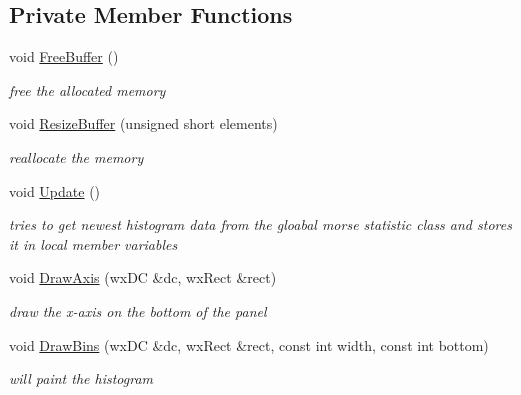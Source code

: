 \subsection*{Private Member Functions}
\begin{DoxyCompactItemize}
\item 
\mbox{\label{classHistogramPanel_aa72fe9e982dd595e60d7ffde9799a458}} 
void \hyperlink{classHistogramPanel_aa72fe9e982dd595e60d7ffde9799a458}{Free\+Buffer} ()
\begin{DoxyCompactList}\small\item\em free the allocated memory \end{DoxyCompactList}\item 
void \hyperlink{classHistogramPanel_ac9dfa965b82be4b009d95eddb9b15417}{Resize\+Buffer} (unsigned short elements)
\begin{DoxyCompactList}\small\item\em reallocate the memory \end{DoxyCompactList}\item 
\mbox{\label{classHistogramPanel_ae88368b1856f4a81b33017842c5eed01}} 
void \hyperlink{classHistogramPanel_ae88368b1856f4a81b33017842c5eed01}{Update} ()
\begin{DoxyCompactList}\small\item\em tries to get newest histogram data from the gloabal morse statistic class and stores it in local member variables \end{DoxyCompactList}\item 
void \hyperlink{classHistogramPanel_a4ae2b45e5450426cdcd47d1be81da36f}{Draw\+Axis} (wx\+DC \&dc, wx\+Rect \&rect)
\begin{DoxyCompactList}\small\item\em draw the x-\/axis on the bottom of the panel \end{DoxyCompactList}\item 
void \hyperlink{classHistogramPanel_ae17ba2aae2b01ddaeb158dd168829e7d}{Draw\+Bins} (wx\+DC \&dc, wx\+Rect \&rect, const int width, const int bottom)
\begin{DoxyCompactList}\small\item\em will paint the histogram \end{DoxyCompactList}\end{DoxyCompactItemize}
